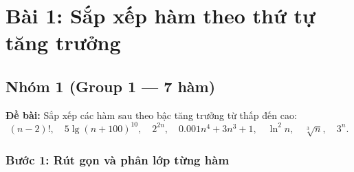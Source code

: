 \documentclass[12pt,a4paper]{article}
\begin{document}
\newpage
\section{Bài 1: Sắp xếp hàm theo thứ tự tăng trưởng}

\subsection{Nhóm 1 (Group 1 --- 7 hàm)}

\textbf{Đề bài:} Sắp xếp các hàm sau theo bậc tăng trưởng từ thấp đến cao:
\[
  (n-2)!, \quad 5\lg(n+100)^{10}, \quad 2^{2n}, \quad 0.001n^4 + 3n^3 + 1, \quad \ln^2 n, \quad \sqrt[3]{n}, \quad 3^n.
\]

\subsubsection{Bước 1: Rút gọn và phân lớp từng hàm}
\end{document}

